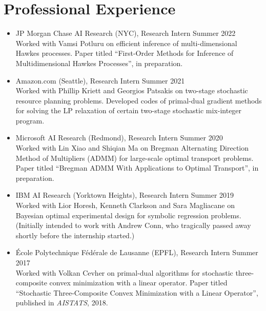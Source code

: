 \documentclass[11pt]{article}
\newcommand{\AISTATS}{Int.\ Conf.\ Artif.\ Intell.\ Stat.\ (AISTATS)}
\begin{document}

\section*{\large Professional Experience}

\begin{itemize}

\item  JP Morgan Chase AI Research (NYC), {Research Intern} \hfill Summer 2022\\[1ex]
Worked with Vamsi Potluru on efficient %
inference of multi-dimensional Hawkes processes. Paper titled ``First-Order Methods for Inference of Multidimensional Hawkes Processes'', in preparation. 

\item  Amazon.com (Seattle), {Research Intern} \hfill Summer 2021\\[1ex]
Worked with Phillip Kriett and Georgios Patsakis on two-stage stochastic resource planning problems. Developed codes of primal-dual gradient methods for solving the LP relaxation of certain two-stage stochastic mix-integer program. 

\item  Microsoft AI Research (Redmond), {Research Intern} \hfill Summer 2020\\[1ex]
Worked with Lin Xiao and Shiqian Ma on %
Bregman Alternating Direction Method of Multipliers (ADMM) for large-scale optimal transport problems.  Paper titled ``Bregman ADMM With Applications to Optimal Transport'', in preparation. 

\newpage

\item  IBM AI Research (Yorktown Heights), {Research Intern} \hfill Summer 2019\\[1ex]
Worked with Lior Horesh, Kenneth Clarkson and Sara Magliacane on Bayesian optimal experimental design for symbolic regression problems. (Initially intended to work with Andrew Conn, who tragically passed away shortly before the internship started.)

\item  \'Ecole Polytechnique F\'ed\'erale de Lausanne (EPFL), {Research Intern} \hfill Summer 2017\\[1ex]
Worked with Volkan Cevher on primal-dual algorithms for stochastic three-composite convex minimization with a linear operator. Paper titled ``Stochastic Three-Composite Convex Minimization with a Linear Operator'', published in {\em AISTATS}, 2018. %


\end{itemize}
\end{document}

